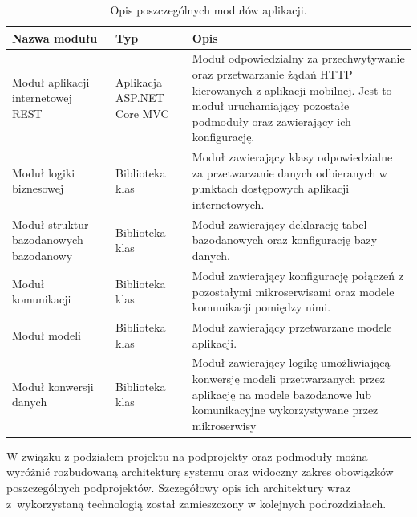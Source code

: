 {\begin{table}[!htb]
	\caption{Opis poszczególnych modułów aplikacji.}
	\label{project-architecture}
	\begin{center}
		\begin{tabular}{ | p{3cm}| p{3cm} | p{6cm} |}
			\hline Nazwa modułu & Typ &  Opis \\ \hline   
			
			\hline  Moduł aplikacji internetowej REST &  Aplikacja ASP.NET Core MVC & Moduł odpowiedzialny za przechwytywanie oraz przetwarzanie żądań HTTP kierowanych z aplikacji mobilnej. Jest to moduł uruchamiający pozostałe podmoduły oraz zawierający ich konfigurację.\\ \hline
			
			\hline  Moduł logiki biznesowej & Biblioteka klas & Moduł zawierający klasy odpowiedzialne za przetwarzanie danych odbieranych w punktach dostępowych aplikacji internetowych. \\ \hline
			
			\hline Moduł struktur bazodanowych \mbox{bazodanowy} & Biblioteka klas & Moduł zawierający deklarację tabel bazodanowych oraz konfigurację bazy danych.\\ \hline
			
			\hline Moduł komunikacji & Biblioteka klas & Moduł zawierający konfigurację połączeń z pozostałymi mikroserwisami oraz modele komunikacji pomiędzy nimi.\\ \hline
			
			\hline Moduł modeli & Biblioteka klas & Moduł zawierający przetwarzane modele aplikacji.\\ \hline
			
			
			\hline Moduł konwersji danych & Biblioteka klas & Moduł zawierający logikę umożliwiającą konwersję modeli przetwarzanych przez aplikację na modele bazodanowe lub komunikacyjne wykorzystywane przez mikroserwisy\\ \hline

		\end{tabular}
	\end{center}
\end{table}	

W związku z podziałem projektu na podprojekty oraz podmoduły można wyróżnić rozbudowaną architekturę systemu oraz widoczny zakres obowiązków poszczególnych podprojektów. Szczegółowy opis ich architektury wraz z~wykorzystaną technologią został zamieszczony w kolejnych podrozdziałach.

}


